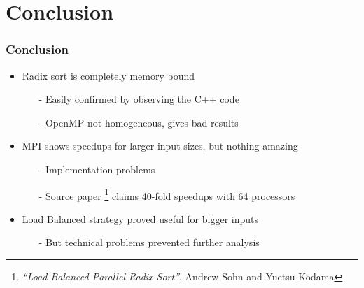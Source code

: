 \section{Conclusion}

\begin{frame}
	\frametitle{Conclusion}

\begin{itemize}\itemsep=10pt
		\item Radix sort is completely memory bound
		\begin{itemize}
			\item[-] Easily confirmed by observing the C++ code
			\item[-] OpenMP not homogeneous, gives bad results
		\end{itemize}


		\item MPI shows speedups for larger input sizes, but nothing amazing
		\begin{itemize}
			\item[-] Implementation problems
			\item[-] Source paper \footnote{\emph{``Load Balanced Parallel Radix Sort''}, Andrew Sohn and Yuetsu Kodama} claims 40-fold speedups with 64 processors
		\end{itemize}

	\item Load Balanced strategy proved useful for bigger inputs
		\begin{itemize}
			\item[-] But technical problems prevented further analysis
		\end{itemize}

	\end{itemize}

\end{frame}
